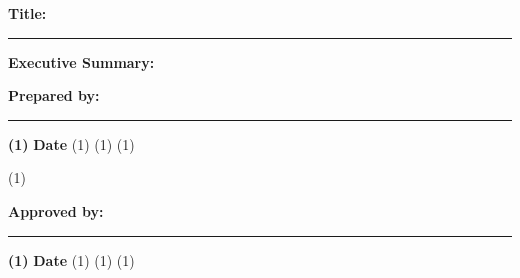 {   \textbf{Title:} \@docTitle

   \vspace{12pt} \hrule height 2pt \vspace{6pt}

   \textbf{Executive Summary:}

   \@docAbstract
   
   \vfill
   
   \begin{minipage}{.48\textwidth}%
      \textbf{Prepared by:} \vspace{6pt}

      \vspace{6pt} \hrule \vspace{5pt}
      \small\textbf{\docAuthorName(1)} \hfill \textbf{Date} \break
      \docAuthorPosition(1) \hfill \break
      \docAuthorOrganization(1) \hfill \break
      \docAuthorLocation(1) \hfill 
      \end{minipage}%
      \begin{minipage}{.01\textwidth}%
      \hfill
   \end{minipage}%
   \checkdocApproverName(1)
   \ifemptydata
   \else
      \begin{minipage}{.48\textwidth}%
         \textbf{Approved by:} \vspace{6pt}
         
         \vspace{6pt} \hrule \vspace{5pt}
         \small\textbf{\docApproverName(1)} \hfill \textbf{Date} \break
         \docApproverPosition(1) \hfill \break
         \docApproverOrganization(1) \hfill \break
         \docApproverLocation(1) \hfill 
         \end{minipage}%
         \begin{minipage}{.01\textwidth}%
         \hfill
      \end{minipage}%
   \fi

}
